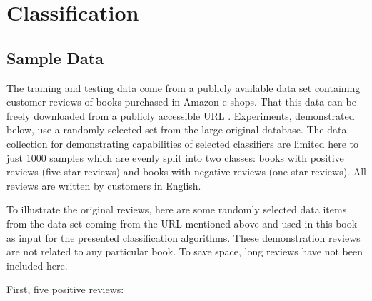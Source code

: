 \chapter{Classification}

\section{Sample Data}

The training and testing data come from a publicly available data set containing
customer reviews of books purchased in Amazon e-shops. That this data can be
freely downloaded from a publicly accessible URL \cite{ref190}. Experiments, demonstrated below, use a randomly selected set from the large original database. The
data collection for demonstrating capabilities of selected classifiers are limited
here to just 1000 samples which are evenly split into two classes: books with
positive reviews (five-star reviews) and books with negative reviews (one-star
reviews). All reviews are written by customers in English.

To illustrate the original reviews, here are some randomly selected data items
from the data set coming from the URL mentioned above \cite{ref190} and used in this
book as input for the presented classification algorithms. These demonstration
reviews are not related to any particular book. To save space, long reviews have
not been included here.

First, five positive reviews:

